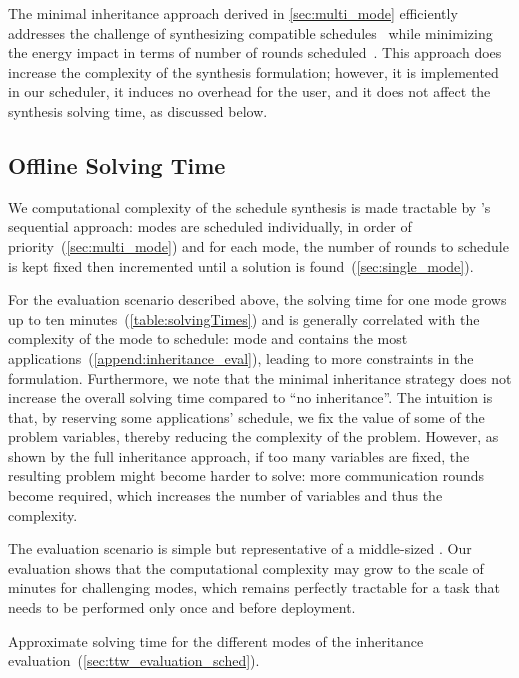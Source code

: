 The minimal inheritance approach derived in \cref{sec:multi_mode} efficiently addresses the challenge of synthesizing compatible schedules~ while minimizing the energy impact in terms of number of rounds scheduled~.
This approach does increase the complexity of the synthesis formulation; however, it is implemented in our \TTW scheduler, it induces no overhead for the user, and it does not affect the synthesis solving time, as discussed below.

\subsection{Offline Solving Time}

We computational complexity of the schedule synthesis is made tractable by \TTW's sequential approach: modes are scheduled individually, in order of priority~(\cref{sec:multi_mode}) and for each mode, the number of rounds to schedule is kept fixed then incremented until a solution is found~(\cref{sec:single_mode}).

For the evaluation scenario described above, the solving time for one mode grows up to ten minutes~(\cref{table:solvingTimes}) and is generally correlated with the complexity of the mode to schedule: mode  and  contains the most applications~(\cref{append:inheritance_eval}), leading to more constraints in the formulation.
Furthermore, we note that the minimal inheritance strategy does not increase the overall solving time compared to ``no inheritance''. The intuition is that, by reserving some applications' schedule, we fix the value of some of the problem variables, thereby reducing the complexity of the problem.
However, as shown by the full inheritance approach, if too many variables are fixed, the resulting problem might become harder to solve: more communication rounds become required, which increases the number of variables and thus the complexity.

The evaluation scenario is simple but representative of a middle-sized \CPS. Our evaluation shows that the computational complexity may grow to the scale of minutes for challenging modes, which remains perfectly tractable for a task that needs to be performed only once and before deployment.

\begin{table}
  \centering
  \caption{Approximate solving time for the different modes of the inheritance evaluation~(\cref{sec:ttw_evaluation_sched}).
  }
  \label{table:solvingTimes}
  {\smaller }
\end{table}






